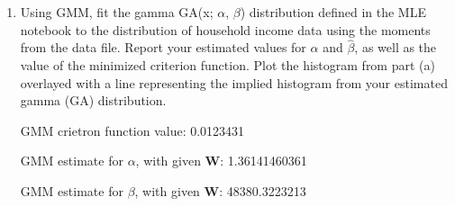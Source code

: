 \documentclass[letterpaper,12pt]{article}
\theoremstyle{definition}
\begin{document}
\begin{enumerate}
\begin{enumerate}
\item Using GMM, fit the gamma GA(x; $\alpha$, $\beta$) distribution defined in the MLE notebook to the distribution of household income data using the moments from the data file. Report your estimated values for $\hat{\alpha}$  and  $\hat{\beta}$, as well as the value of the minimized criterion function. Plot the histogram from part (a) overlayed with a line representing the implied histogram from your estimated gamma (GA) distribution.
\par
\begin{figure}[H]\centering\captionsetup{width=4.0in}
\end{figure}
\par
GMM crietron function value: 0.0123431\par
GMM estimate for $\alpha$, with given $\textbf{W}$: 1.36141460361  \par
GMM estimate for $\beta$, with given $\textbf{W}$: 48380.3223213 \par
\bigskip


\end{enumerate}
\end{enumerate}
\end{document}
